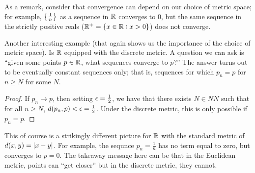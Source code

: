 \noindent As a remark, consider that convergence can depend on our choice of metric space; for example, $\set{\frac{1}{n}}$ as a sequence in $\mathbb{R}$ converges to $0$, but the same sequence in the strictly positive reals ($\mathbb{R}^+ = \set{x \in \mathbb{R}: x > 0}$) does not converge.

Another interesting example (that again shows us the importance of the choice of metric space). Is $\mathbb{R}$ equipped with the discrete metric. A question we can ask is ``given some points $p \in \mathbb{R}$, what sequences converge to $p$?'' The answer turns out to be eventually constant sequences only; that is, sequences for which $p_n = p$ for $n \geq N$ for some $N$. 
\begin{proof}
    If $p_n \rightarrow p$, then setting $\epsilon = \frac{1}{2}$, we have that there exists $N \in NN$ such that for all $n \geq N$, $d(p_n, p) < \epsilon = \frac{1}{2}$. Under the discrete metric, this is only possible if $p_n = p$. 
\end{proof}
This of course is a strikingly different picture for $\mathbb{R}$ with the standard metric of $d(x, y) = \abs{x - y}$. For example, the sequnce $p_n = \frac{1}{n}$ has no term equal to zero, but converges to $p = 0$. The takeaway message here can be that in the Euclidean metric, points can ``get closer'' but in the discrete metric, they cannot.

